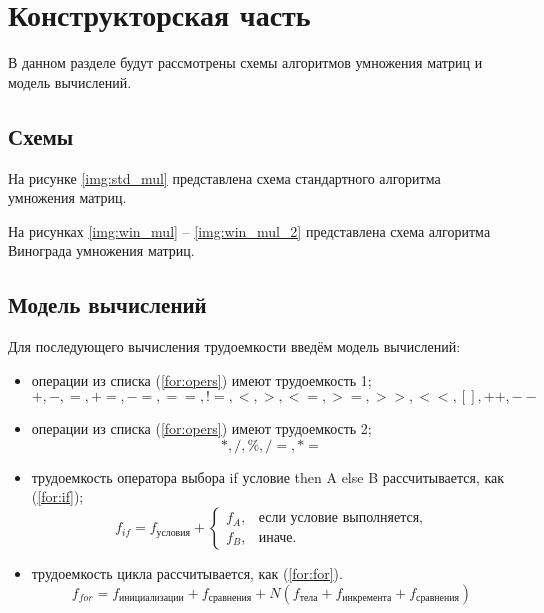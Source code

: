 \chapter{Конструкторская часть}

В данном разделе будут рассмотрены схемы алгоритмов умножения матриц и модель вычислений.

\section{Схемы}
На рисунке \ref{img:std_mul} представлена схема стандартного алгоритма умножения матриц.


\clearpage

На рисунках \ref{img:win_mul} -- \ref{img:win_mul_2} представлена схема алгоритма Винограда умножения матриц.



\clearpage
\section{Модель вычислений}

Для последующего вычисления трудоемкости введём модель вычислений:

\begin{itemize}
	\item операции из списка (\ref{for:opers}) имеют трудоемкость 1;
	\begin{equation}
	\label{for:opers}
	+, -, =, +=, -=, ==, !=, <, >, <=, >=, >>, <<, [], ++, {-}-
	\end{equation}
	\item операции из списка (\ref{for:opers}) имеют трудоемкость 2;
	\begin{equation}
	\label{for:opers2}
	*,  /, \%, /=, *=
	\end{equation}
	\item трудоемкость оператора выбора if условие then A else B рассчитывается, как (\ref{for:if});
	\begin{equation}
	\label{for:if}
	f_{if} = f_{\text{условия}} +
	\begin{cases}
	f_A, & \text{если условие выполняется,}\\
	f_B, & \text{иначе.}
	\end{cases}
	\end{equation}
	\item трудоемкость цикла рассчитывается, как (\ref{for:for}).
	\begin{equation}
	\label{for:for}
	f_{for} = f_{\text{инициализации}} + f_{\text{сравнения}} + N(f_{\text{тела}} + f_{\text{инкремента}} + f_{\text{сравнения}})
	\end{equation}
\end{itemize}

